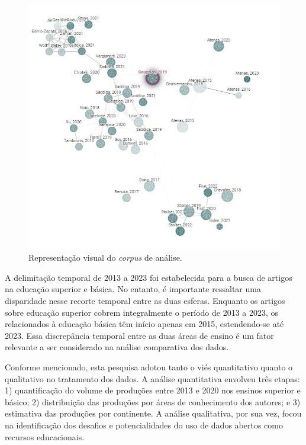 \documentclass[portuguese]{textolivre}
\begin{document}
\begin{figure}[h]
\centering
\begin{minipage}{0.75\linewidth}
\includegraphics[width=\linewidth]{Fig2.png}
\caption{Representação visual do \textit{corpus} de análise.}
\label{fig2}
\end{minipage}
\end{figure}

A delimitação temporal de 2013 a 2023 foi estabelecida para a busca de artigos na educação superior e básica.
No entanto, é importante ressaltar uma disparidade nesse recorte temporal entre as duas esferas. Enquanto os artigos sobre educação superior cobrem integralmente o período de 2013 a 2023, os relacionados à educação básica têm início apenas em 2015, estendendo-se até 2023. Essa discrepância temporal entre as duas áreas de ensino é um fator relevante a ser considerado na análise comparativa dos dados.

Conforme mencionado, esta pesquisa adotou tanto o viés quantitativo quanto o qualitativo no tratamento dos dados. A análise quantitativa envolveu três etapas: 1) quantificação do volume de produções entre 2013 e 2020 nos ensinos superior e básico; 2) distribuição das produções por áreas de conhecimento dos autores; e 3) estimativa das produções por continente. A análise qualitativa, por sua vez, focou na identificação dos desafios e potencialidades do uso de dados abertos como recursos educacionais.
\end{document}
